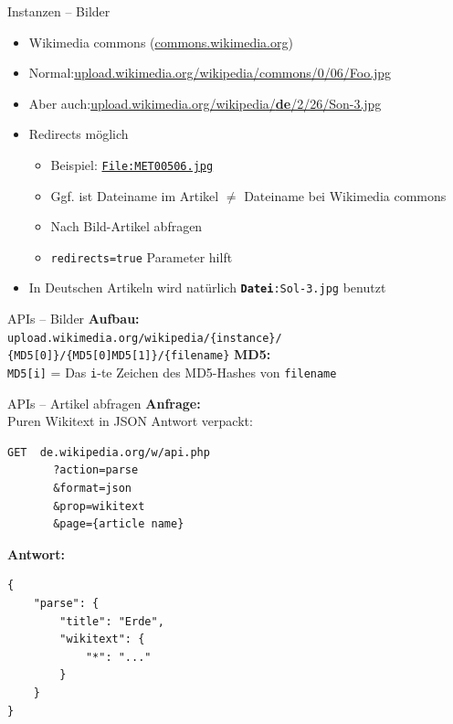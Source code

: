 \documentclass[9pt]{beamer}
\begin{document}
	\begin{frame}{Instanzen -- Bilder}
		\begin{itemize}
			\item Wikimedia commons (\href{https://commons.wikimedia.org}{commons.wikimedia.org})
			\item Normal:\newline \href{https://upload.wikimedia.org/wikipedia/commons/0/06/Foo.jpg}{upload.wikimedia.org/wikipedia/commons/0/06/Foo.jpg}
			\item Aber auch:\newline \href{https://upload.wikimedia.org/wikipedia/de/2/26/Son-3.jpg}{upload.wikimedia.org/wikipedia/\textbf{de}/2/26/Son-3.jpg}
			\pause
			
			\item Redirects möglich
			\begin{itemize}
				\item Beispiel: \href{https://commons.wikimedia.org/w/index.php?title=File:MET00506.jpg&action=edit}{\texttt{File:MET00506.jpg}}
				\item Ggf. ist Dateiname im Artikel $\neq$ Dateiname bei Wikimedia commons
				\item Nach Bild-Artikel abfragen
				\item \texttt{redirects=true} Parameter hilft
			\end{itemize}
			\pause
			
			\item In Deutschen Artikeln wird natürlich \texttt{\textbf{Datei}:Sol-3.jpg} benutzt
		\end{itemize}
	\end{frame}

	\begin{frame}{APIs -- Bilder}
		\textbf{Aufbau:}\\
		\texttt{upload.wikimedia.org/wikipedia/\{instance\}/}
		\texttt{\{MD5[0]\}/\{MD5[0]MD5[1]\}/\{filename\}}
		\n
		\textbf{MD5:}\\
		\texttt{MD5[i]} = Das \texttt{i}-te Zeichen des MD5-Hashes von \texttt{filename}
	\end{frame}

	\begin{frame}[fragile]{APIs -- Artikel abfragen}
		\textbf{Anfrage:}\\
		Puren Wikitext in JSON Antwort verpackt:\\
		\begin{verbatim}
GET  de.wikipedia.org/w/api.php
       ?action=parse
       &format=json
       &prop=wikitext
       &page={article name}
		\end{verbatim}\n
		\textbf{Antwort:}
		\begin{verbatim}
{
    "parse": {
        "title": "Erde",
        "wikitext": {
            "*": "..."
        }
    }
}
		\end{verbatim}
	\end{frame}
\end{document}
